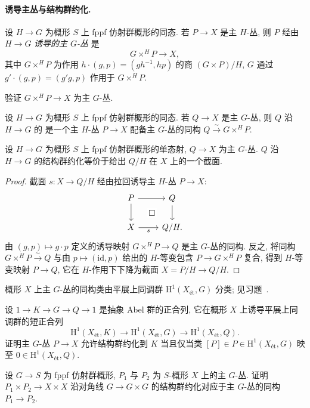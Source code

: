 \paragraph{诱导主丛与结构群约化.}
\begin{definition}[诱导主丛]\label{src:B.1.62}
设 $H\to G$ 为概形 $S$ 上 fppf 仿射群概形的同态. 若 $P\to X$ 是主 $H$-丛, 则 $P$ 经由 $H\to G$ \textit{诱导的主 $G$-丛} 是
\[
G\times^H P\to X,
\]
其中 $G\times^H P$ 为作用 $h\cdot(g,p)=(gh^{-1},hp)$ 的商 $(G\times P)/H$, $G$ 通过 $g'\cdot(g,p)=(g'g,p)$ 作用于 $G\times^H P$.
\end{definition}
\begin{exercise}\label{src:B.1.63}
验证 $G\times^H P\to X$ 为主 $G$-丛.
\end{exercise}
\begin{definition}[结构群约化]\label{src:B.1.64}
设 $H\to G$ 为概形 $S$ 上 fppf 仿射群概形的同态. 若 $Q\to X$ 是主 $G$-丛, 则 $Q$ 沿 $H\to G$ 的 是一个主 $H$-丛 $P\to X$ 配备主 $G$-丛的同构 $Q\xrightarrow{\sim}G\times^H P$.
\end{definition}
\begin{lemma}\label{src:B.1.65}
设 $H\to G$ 为概形 $S$ 上 fppf 仿射群概形的单态射, $Q\to X$ 为主 $G$-丛. $Q$ 沿 $H\to G$ 的结构群约化等价于给出 $Q/H$ 在 $X$ 上的一个截面.
\end{lemma}
\begin{proof}
截面 $s:X\to Q/H$ 经由拉回诱导主 $H$-丛 $P\to X$:
\[
\begin{tikzcd}
P\arrow[r]\arrow[d]&Q\arrow[d]\\
X\arrow[r,"s"']\arrow[ur,phantom,"\square" description]&Q/H.
\end{tikzcd}
\]
由 $(g,p)\mapsto g\cdot p$ 定义的诱导映射 $G\times^H P\to Q$ 是主 $G$-丛的同构. 反之, 将同构 $G\times^H P\xrightarrow{\sim}Q$ 与由 $p\mapsto(\mathrm{id},p)$ 给出的 $H$-等变包含 $P\to G\times^H P$ 复合, 得到 $H$-等变映射 $P\to Q$, 它在 $H$-作用下下降为截面 $X=P/H\to Q/H$.
\end{proof}
概形 $X$ 上主 $G$-丛的同构类由平展上同调群 $\mathrm H^1(X_{\text{ét}},G)$ 分类; 见习题~.
\begin{exercise}\label{src:B.1.66}
设 $1\to K\to G\to Q\to1$ 是抽象 Abel 群的正合列, 它在概形 $X$ 上诱导平展上同调群的短正合列
\[
\mathrm H^1(X_{\text{ét}},K)\to\mathrm H^1(X_{\text{ét}},G)\to\mathrm H^1(X_{\text{ét}},Q).
\]
证明主 $G$-丛 $P\to X$ 允许结构群约化到 $K$ 当且仅当类 $[P]\in P\in\mathrm H^1(X_{\text{ét}},G)$ 映至 $0\in\mathrm H^1(X_{\text{ét}},Q)$.
\end{exercise}
\begin{exercise}\label{src:B.1.67}
设 $G\to S$ 为 fppf 仿射群概形, $P_1$ 与 $P_2$ 为 $S$-概形 $X$ 上的主 $G$-丛. 证明 $P_1\times P_2\to X\times X$ 沿对角线 $G\to G\times G$ 的结构群约化对应于主 $G$-丛的同构 $P_1\to P_2$.
\end{exercise}

